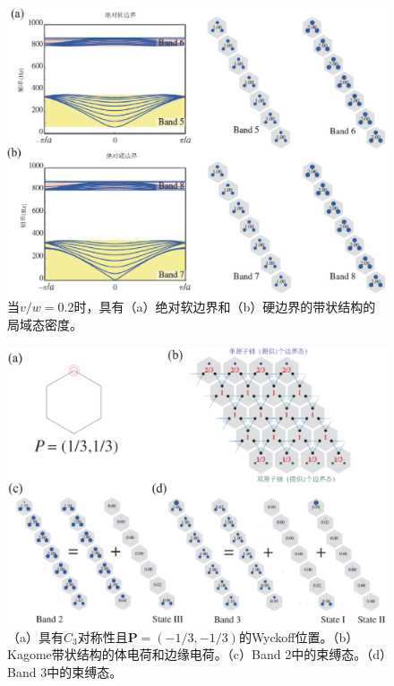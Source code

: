 \begin{figure}[h!]
  \centering
  \includegraphics[width=1\textwidth]{images/fig3-9.eps} 
  \caption{当\(v/w = 0.2\)时，具有（a）绝对软边界和（b）硬边界的带状结构的局域态密度。}
  \label{fig_3_9}
\end{figure}

\begin{figure}[h!]
  \centering
  \includegraphics[width=1\textwidth]{images/fig3-10.eps} 
  \caption{（a）具有\(C_3\)对称性且\(\mathbf{P}=(-1/3,-1/3)\)的Wyckoff位置。（b）Kagome带状结构的体电荷和边缘电荷。（c）Band 2中的束缚态。（d）Band 3中的束缚态。}
  \label{fig_3_10}
\end{figure}

